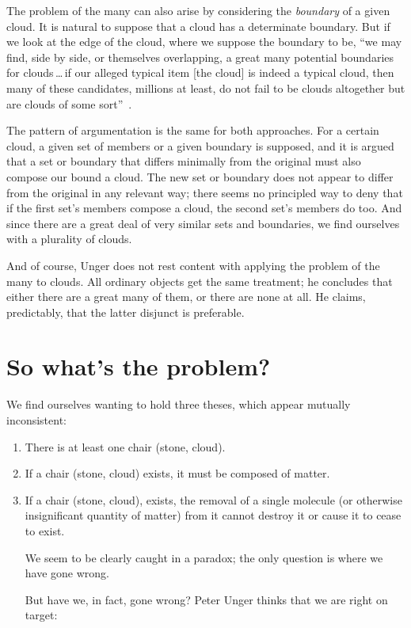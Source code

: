 \documentclass[11pt]{standalone} \newif\ifstandlone \standalonetrue
\begin{document}
\begin{spacing}{1.5}
The problem of the many can also arise by considering the {\em
  boundary} of a given cloud.  It is natural to suppose that a cloud
has a determinate boundary.  But if we look at the edge of the cloud,
where we suppose the boundary to be, ``we may find, side by side, or
themselves overlapping, a great many potential boundaries for
clouds\,\ldots\,if our alleged typical item {[}the cloud{]} is indeed
a typical cloud, then many of these candidates, millions at least, do
not fail to be clouds altogether but are clouds of some
sort''~\citep[420--421]{unger1980a}.

The pattern of argumentation is the same for both approaches.  For a
certain cloud, a given set of members or a given boundary is supposed,
and it is argued that a set or boundary that differs minimally from
the original must also compose our bound a cloud.  The new set or
boundary does not appear to differ from the original in any relevant
way; there seems no principled way to deny that if the first set's
members compose a cloud, the second set's members do too.  And since
there are a great deal of very similar sets and boundaries, we find
ourselves with a plurality of clouds.

And of course, Unger does not rest content with applying the problem
of the many to clouds.  All ordinary objects get the same treatment;
he concludes that either there are a great many of them, or there are
none at all.  He claims, predictably, that the latter disjunct is
preferable.

\section{So what's the problem?}
We find ourselves wanting to hold three theses, which appear mutually
inconsistent:

\begin{enumerate}
  \item There is at least one chair (stone, cloud).
  \item If a chair (stone, cloud) exists, it must be composed of
    matter.
  \item If a chair (stone, cloud), exists, the removal of a single
    molecule (or otherwise insignificant quantity of matter) from it
    cannot destroy it or cause it to cease to exist.

We seem to be clearly caught in a paradox; the only question is where
we have gone wrong.

But have we, in fact, gone wrong?  Peter Unger thinks that we are
right on target:


\end{enumerate}
\end{spacing}
\end{document}
